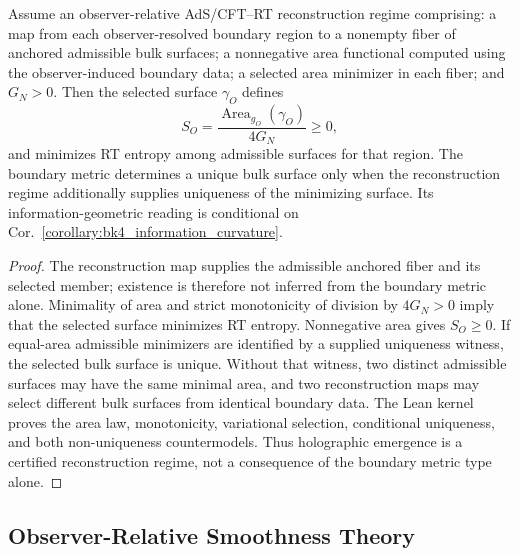\begin{proposition}\label{proposition:bk4_holographic_emergence}
Assume an observer-relative AdS/CFT--RT reconstruction regime comprising: a
map from each observer-resolved boundary region to a nonempty fiber of anchored
admissible bulk surfaces; a nonnegative area functional computed using the
observer-induced boundary data; a selected area minimizer in each fiber; and
$G_N>0$.  Then the selected surface $\gamma_O$ defines
\begin{equation}
 S_O=\frac{\operatorname{Area}_{g_O}(\gamma_O)}{4G_N}\geq0,
\end{equation}
and minimizes RT entropy among admissible surfaces for that region.  The
boundary metric determines a unique bulk surface only when the reconstruction
regime additionally supplies uniqueness of the minimizing surface.  Its
information-geometric reading is conditional on
Cor.~\ref{corollary:bk4_information_curvature}.
\end{proposition}
\begin{proof}
\label{proof:bk4_holographic_emergence}
The reconstruction map supplies the admissible anchored fiber and its selected
member; existence is therefore not inferred from the boundary metric alone.
Minimality of area and strict monotonicity of division by $4G_N>0$ imply that
the selected surface minimizes RT entropy. Nonnegative area gives $S_O\geq0$.
If equal-area admissible minimizers are identified by a supplied uniqueness
witness, the selected bulk surface is unique. Without that witness, two
distinct admissible surfaces may have the same minimal area, and two
reconstruction maps may select different bulk surfaces from identical boundary
data. The Lean kernel proves the area law, monotonicity, variational selection,
conditional uniqueness, and both non-uniqueness countermodels. Thus holographic
emergence is a certified reconstruction regime, not a consequence of the
boundary metric type alone.
\end{proof}

\subsection{Observer-Relative Smoothness Theory}

